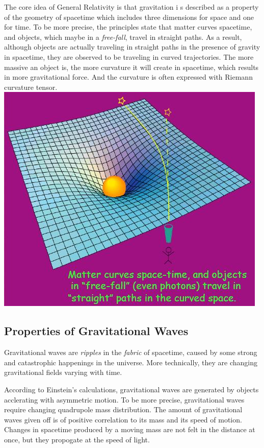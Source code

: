 \documentclass[aps,prl,preprint]{revtex4}
\begin{document}
The core idea of General Relativity is that gravitation i s described as a property of the geometry of spacetime which includes three dimensions for space and one for time. To be more precise, the principles state that matter curves spacetime, and objects, which maybe in a \emph{free-fall}, travel in straight paths. As a result, although objects are actually traveling in straight paths in the presence of gravity in spacetime, they are observed to be traveling in curved trajectories. The more massive an object is, the more curvature it will create in spacetime, which results in more gravitational force. And the curvature is often expressed with Riemann curvature tensor. \cite{Tensor,wikitensor}\newline
\includegraphics{curvature}

\subsection{Properties of Gravitational Waves}
Gravitational waves are \emph{ripples} in the \emph{fabric} of spacetime, caused by some strong and catastrophic happenings in the universe. More technically, they are changing gravitational fields varying with time.

According to Einstein's calculations, gravitational waves are generated by objects acclerating with asymmetric motion. To be more precise, gravitational waves require changing quadrupole mass distribution. \cite{SBackground} The amount of gravitational waves given off is of positive correlation to its mass and its speed of motion. Changes in spacetime produced by a moving mass are not felt in the distance at once, but they propogate at the speed of light.
\end{document}
